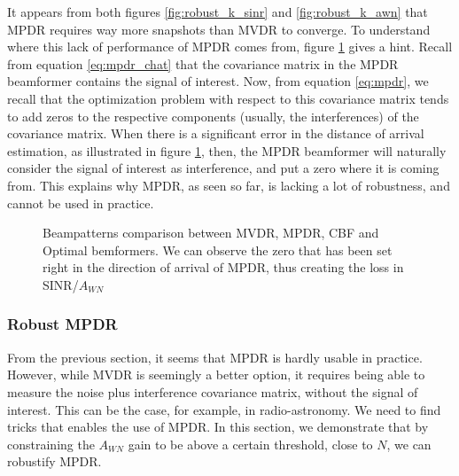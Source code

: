 \documentclass[12pt]{article}
\begin{document}
It appears from both figures \ref{fig:robust_k_sinr} and \ref{fig:robust_k_awn} that MPDR requires way more snapshots than MVDR to converge. To understand where this lack of performance of MPDR comes from, figure \ref{fig:poor_mvdr_beampattern} gives a hint. Recall from equation \ref{eq:mpdr_chat} that the covariance matrix in the MPDR beamformer contains the signal of interest. Now, from equation \ref{eq:mpdr}, we recall that the optimization problem with respect to this covariance matrix tends to add zeros to the respective components (usually, the interferences) of the covariance matrix. When there is a significant error in the distance of arrival estimation, as illustrated in figure \ref{fig:poor_mvdr_beampattern}, then, the MPDR beamformer will naturally consider the signal of interest as interference, and put a zero where it is coming from. This explains why MPDR, as seen so far, is lacking a lot of robustness, and cannot be used in practice.

\begin{figure}[H]
    \centering
    
    \caption{Beampatterns comparison between MVDR, MPDR, CBF and Optimal bemformers. We can observe the zero that has been set right in the direction of arrival of MPDR, thus creating the loss in SINR/$A_{WN}$}
    \label{fig:poor_mvdr_beampattern}
\end{figure}
\subsubsection{Robust MPDR}
From the previous section, it seems that MPDR is hardly usable in practice. However, while MVDR is seemingly a better option, it requires being able to measure the noise plus interference covariance matrix, without the signal of interest. This can be the case, for example, in radio-astronomy. We need to find tricks that enables the use of MPDR. In this section, we demonstrate that by constraining the $A_{WN}$ gain to be above a certain threshold, close to $N$, we can robustify MPDR.
\end{document}
